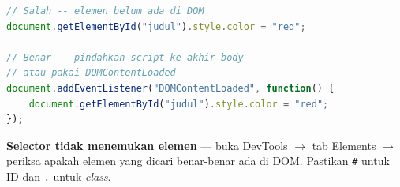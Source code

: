 \begin{lstlisting}[language=JavaScript, caption={Penanganan elemen belum tersedia}, label={lst:10-trouble}]
// Salah -- elemen belum ada di DOM
document.getElementById("judul").style.color = "red";

// Benar -- pindahkan script ke akhir body
// atau pakai DOMContentLoaded
document.addEventListener("DOMContentLoaded", function() {
    document.getElementById("judul").style.color = "red";
});
\end{lstlisting}

\begin{tip}
\textbf{Selector tidak menemukan elemen} --- buka DevTools $\rightarrow$ tab Elements $\rightarrow$ periksa apakah elemen yang dicari benar-benar ada di DOM. Pastikan \texttt{\#} untuk ID dan \texttt{.} untuk \emph{class}.
\end{tip}

